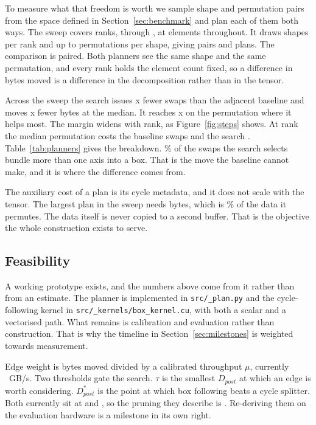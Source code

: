 To measure what that freedom is worth we sample shape and permutation pairs
from the space defined in Section~\ref{sec:benchmark} and plan each of them
both ways. The sweep covers \planRanks{} ranks, \planRankLo{} through
\planRankHi{}, at \planElements{} elements throughout. It draws
\planShapesPerRank{} shapes per rank and up to \planPermsPerShape{}
permutations per shape, giving \planCases{} pairs and \planPlans{} plans. The
comparison is paired. Both planners see the same shape and the same
permutation, and every rank holds the element count fixed, so a difference in
bytes moved is a difference in the decomposition rather than in the tensor.

Across the sweep the search issues \planStepFactor{}x fewer swaps than the
adjacent baseline and moves \planByteFactor{}x fewer bytes at the median. It
reaches \planByteFactorMax{}x on the permutation where it helps most. The
margin widens with rank, as Figure~\ref{fig:steps} shows. At rank
\planRankHi{} the median permutation costs the baseline
\planStepsBaselineTop{} swaps and the search \planStepsSearchTop{}.
Table~\ref{tab:planners} gives the breakdown. \planBlockShare{}\% of the swaps
the search selects bundle more than one axis into a box. That is the move the
baseline cannot make, and it is where the difference comes from.

The auxiliary cost of a plan is its cycle metadata, and it does not scale with
the tensor. The largest plan in the sweep needs \planAuxWorst{} bytes, which
is \planAuxPercent{}\% of the data it permutes. The data itself is never
copied to a second buffer. That is the objective the whole construction exists
to serve.




\subsection{Feasibility}
\label{sec:feasibility}

A working prototype exists, and the numbers above come from it rather than
from an estimate. The planner is implemented in \texttt{src/\_plan.py} and the
cycle-following kernel in \texttt{src/\_kernels/box\_kernel.cu}, with both a
scalar and a vectorised path. What remains is calibration and evaluation
rather than construction. That is why the timeline in
Section~\ref{sec:milestones} is weighted towards measurement.

Edge weight is bytes moved divided by a calibrated throughput $\mu$, currently
\costMu{}~GB/s. Two thresholds gate the search. $\tau$ is the smallest
$D_{post}$ at which an edge is worth considering. $D_{post}^{*}$ is the point
at which box following beats a cycle splitter. Both currently sit at
\costTau{} and \costDPostStar{}, so the pruning they describe is
\costPruning{}. Re-deriving them on the evaluation hardware is a milestone in
its own right.

